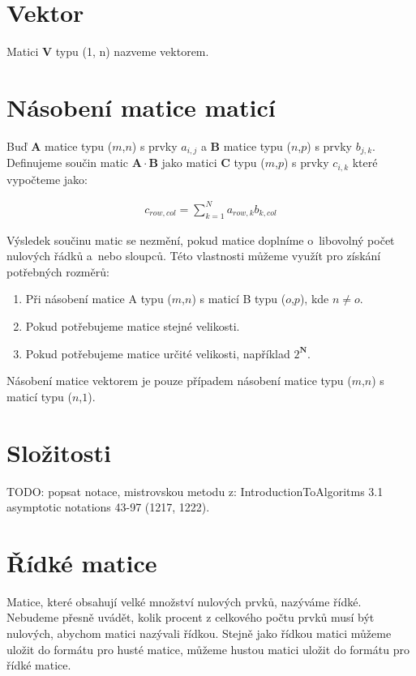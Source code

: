 \section{Vektor}

Matici \textbf{V} typu (1, n) nazveme vektorem.

\section{Násobení matice maticí}

Buď \textbf{A} matice typu ($m$,$n$) s prvky $a_{i,j}$ a \textbf{B} matice typu ($n$,$p$) s prvky $b_{j,k}$. Definujeme součin matic $\mathbf{A} \cdot \mathbf{B}$ jako matici \textbf{C} typu ($m$,$p$) s prvky $c_{i,k}$ které vypočteme jako:

\begin{align}
c_{row,col}=\sum_{k=1}^{N} a_{row,k} b_{k,col}
\end{align}

Výsledek součinu matic se nezmění, pokud matice doplníme o~libovolný počet nulových řádků a~nebo sloupců. Této vlastnosti můžeme využít pro získání potřebných rozměrů:

\begin{enumerate}
  \item Při násobení matice A typu ($m$,$n$) s maticí B typu ($o$,$p$), kde $ n \neq o $.
  \item Pokud potřebujeme matice stejné velikosti.
  \item Pokud potřebujeme matice určité velikosti, například $ 2^{ \mathbf{N}} $.
\end{enumerate}

Násobení matice vektorem je pouze případem násobení matice typu ($m$,$n$) s maticí typu ($n$,$1$).

\section{Složitosti}

TODO: popsat notace, mistrovskou metodu z: IntroductionToAlgoritms 3.1 asymptotic notations 43-97 (1217, 1222).

\section{Řídké matice}

Matice, které obsahují velké množství nulových prvků, nazýváme řídké. Nebudeme přesně uvádět, kolik procent z celkového počtu prvků musí být nulových, abychom matici nazývali řídkou. Stejně jako řídkou matici můžeme uložit do formátu pro husté matice, můžeme hustou matici uložit do formátu pro řídké matice.

